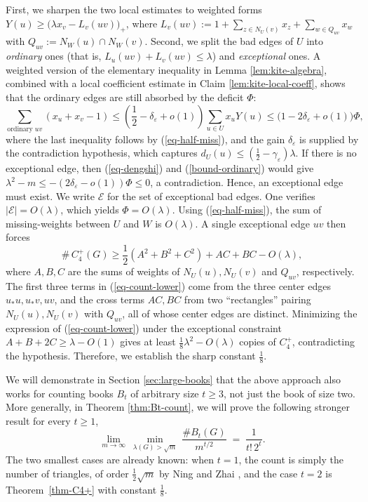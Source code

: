 \documentclass[11pt,a4paper]{article}
\theoremstyle{definition}
\theoremstyle{plain}
\renewcommand{\le}{\leqslant}
\renewcommand{\ge}{\geqslant}
\begin{document}
 First, 
we sharpen the two local estimates to weighted forms
$Y(u)\ge \big(\lambda x_v-L_v(uv) \big)_+$, where  $L_v(uv):=1+\sum_{z\in N_U(v)} x_z + \sum_{w\in Q_{uv}} x_w$ with $Q_{uv}:=N_W(u)\cap N_W(v)$.   Second, we split the bad
edges of $U$ into \emph{ordinary} ones (that is, $L_u(uv)+L_v(uv)\le\lambda$) and
\emph{exceptional} ones. A weighted version of the elementary inequality in Lemma \ref{lem:kite-algebra}, combined with
a local coefficient estimate in Claim \ref{lem:kite-local-coeff}, shows that the ordinary edges are still absorbed
by the deficit $\Phi$:
\begin{equation} \label{bound-ordinary}  \sum_{\text{ordinary $uv$}}(x_u+x_v-1)\le \left( \frac{1}{2}-\delta_{\varepsilon}+o(1) \right) \sum_{u\in U} x_uY(u) \le \big( 1- 2\delta_{\varepsilon} + o(1) \big)\Phi, 
\end{equation} 
where the last inequality follows by (\ref{eq-half-miss}), and the gain
$\delta_{\varepsilon}$ is supplied by the contradiction hypothesis, which captures 
$d_U(u)\le(\tfrac12-\gamma_{\varepsilon} )\lambda$. 
If there is no exceptional edge, then
 (\ref{eq-dengshi}) and (\ref{bound-ordinary})  would give $\lambda^2-m\le-(2\delta_{\varepsilon} -o(1))\Phi\le0$, a contradiction.
Hence, an exceptional edge must exist. 
We write $\mathcal E$ for the set of exceptional bad edges. One verifies $|\mathcal E|=O(\lambda)$, which yields 
$\Phi=O(\lambda)$. Using (\ref{eq-half-miss}), the sum of missing-weights between $U$ and $W$ is $O(\lambda)$. A single
exceptional edge $uv$ then forces
\begin{equation} \label{eq-count-lower}
\texttt{\#} \,C_4^+(G)\ge 
\frac{1}{2} (A^2+B^2+C^2)+AC+BC-O(\lambda),
\end{equation}
where $A,B,C$ are the sums of weights of $N_U(u),N_U(v)$ and
$Q_{uv}$, respectively. 
The first three terms in (\ref{eq-count-lower}) come from the three center
edges $u_*u,u_*v,uv$, and the cross terms $AC,BC$ from two ``rectangles''
pairing $N_U(u),N_U(v)$ with $Q_{uv}$, all of whose center edges are distinct.
Minimizing the expression of (\ref{eq-count-lower}) under the exceptional constraint
$A+B+2C\ge\lambda-O(1)$ gives at least $\tfrac18\lambda^2-O(\lambda)$ copies of
$C_4^+$, contradicting the hypothesis. 
Therefore, we establish the sharp constant
$\tfrac18$. 

\smallskip 
\noindent
{} 
We will demonstrate in Section \ref{sec:large-books} that the above approach also works for counting books $B_t$ of arbitrary size $t \ge 3$, not just the book of size two. 
More generally, in Theorem \ref{thm:Bt-count}, we will prove the following stronger result for every $t\ge 1$,   
\begin{equation} \label{eq-heart} \tag{$\heartsuit$}
   \lim_{m\to\infty}\ \min_{\lambda(G)>\sqrt m}\
   \frac{\texttt{\#} B_t(G)}{m^{t/2}}\;=\;\frac{1}{t!\,2^{t}} .
\end{equation}
The two smallest cases are already known: when $t=1$, the count is simply the number of triangles, of order $\tfrac12\sqrt m$ by Ning and Zhai \cite{NingZhai2023},
and the case $t=2$ is Theorem~\ref{thm-C4+} with constant $\tfrac18$. 
\end{document}

